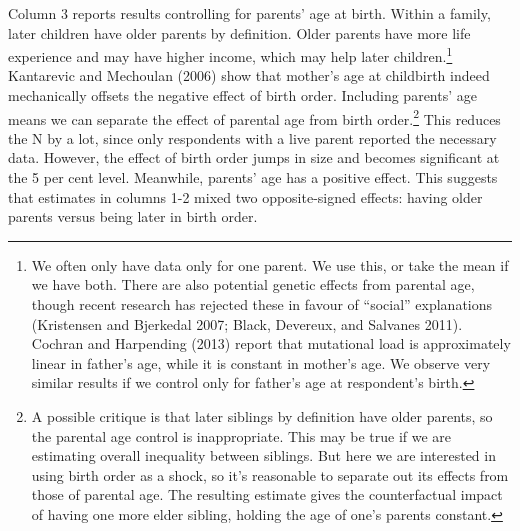 \documentclass[
  12pt,
]{article}
\theoremstyle{definition}
\theoremstyle{definition}
\theoremstyle{definition}
\theoremstyle{definition}
\theoremstyle{remark}
\begin{document}
Column 3 reports results controlling for parents' age at birth. Within a family,
later children have older parents by definition. Older parents have more life
experience and may have higher income, which may help later children.\footnote{We often only have data only for one parent. We use this, or take the mean
  if we have both. There are also potential genetic effects from parental age,
  though recent research has rejected these in favour of ``social'' explanations
  (Kristensen and Bjerkedal 2007; Black, Devereux, and Salvanes 2011). Cochran and Harpending (2013) report that
  mutational load is approximately linear in father's age, while it is constant in
  mother's age. We observe very similar results if we control only for father's
  age at respondent's birth.}
Kantarevic and Mechoulan (2006) show that mother's age at childbirth indeed mechanically
offsets the negative effect of birth order. Including parents' age means we
can separate the effect of parental age from birth order.\footnote{A possible critique is that later siblings by definition
  have older parents, so the parental age control is inappropriate. This may be
  true if we are estimating overall inequality between siblings. But here we are
  interested in using birth order as a shock, so it's reasonable to separate out
  its effects from those of parental age. The resulting estimate gives the
  counterfactual impact of having one more elder sibling, holding the age of one's
  parents constant.} This
reduces the N by a lot, since only respondents with a live parent reported the
necessary data. However, the effect of birth order jumps in size and becomes
significant at the 5 per cent level. Meanwhile, parents' age has a positive
effect. This suggests that estimates in columns 1-2 mixed two opposite-signed
effects: having older parents versus being later in birth order.

 
  \providecommand{\huxb}[2]{\arrayrulecolor[RGB]{#1}\global\arrayrulewidth=#2pt}
  \providecommand{\huxvb}[2]{\color[RGB]{#1}\vrule width #2pt}
  \providecommand{\huxtpad}[1]{\rule{0pt}{#1}}
  \providecommand{\huxbpad}[1]{\rule[-#1]{0pt}{#1}}
\end{document}
